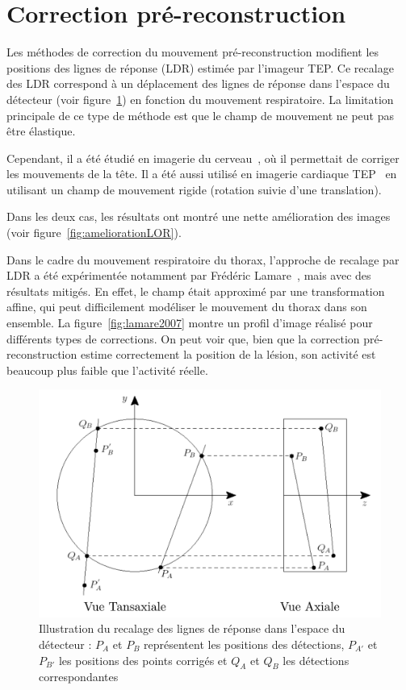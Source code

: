 \section{Correction pré-reconstruction}
\label{lab:corrPreRecon}
Les méthodes de correction du mouvement pré-reconstruction modifient les positions des lignes de réponse (LDR) estimée par l'imageur TEP.
Ce recalage des LDR correspond à un déplacement des lignes de réponse dans l'espace du détecteur (voir figure~\ref{fig:recalageLOR}) en fonction du mouvement respiratoire. La limitation principale de ce type de méthode est que le champ de mouvement ne peut pas être élastique.

Cependant, il a été étudié en imagerie du cerveau~\cite{bloomfield2003design}, où il permettait de corriger les mouvements de la tête. Il a été aussi utilisé en imagerie cardiaque TEP~\cite{livieratos2005rigid} en utilisant un champ de mouvement rigide (rotation suivie d'une translation).

Dans les deux cas, les résultats ont montré une nette amélioration des images (voir figure~\ref{fig:ameliorationLOR}).

Dans le cadre du mouvement respiratoire du thorax, l'approche de recalage par LDR a été expérimentée notamment par Frédéric Lamare~\cite{lamare2007respiratory}, mais avec des résultats mitigés. En effet, le champ était approximé par une transformation affine, qui peut difficilement modéliser le mouvement du thorax dans son ensemble. La figure~\ref{fig:lamare2007} montre un profil d'image réalisé pour différents types de corrections. On peut voir que, bien que la correction pré-reconstruction estime correctement la position de la lésion, son activité est beaucoup plus faible que l'activité réelle.

\begin{figure}[h!]
	\begin{center}
		\includegraphics[width=12cm]{images/recalageLOR}
	\end{center}
	\caption[Illustration du recalage des lignes de réponse dans l'espace du détecteur]{Illustration du recalage des lignes de réponse dans l'espace du détecteur : $P_A$ et $P_B$ représentent les positions des détections, $P_{A'}$ et $P_{B'}$ les positions des points corrigés et $Q_A$ et $Q_B$ les détections correspondantes } 
	\label{fig:recalageLOR}
\end{figure}


